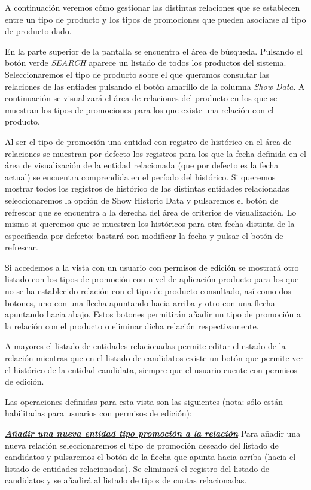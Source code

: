 A continuación veremos cómo gestionar las distintas relaciones que se establecen entre un tipo de producto y los tipos de promociones que pueden asociarse al tipo de producto dado.


En la parte superior de la pantalla se encuentra el área de búsqueda. Pulsando el botón verde \emph{SEARCH} aparece un listado de todos los productos del sistema. Seleccionaremos el tipo de producto sobre el que queramos consultar las relaciones de las entiades pulsando el botón amarillo de la columna \emph{Show Data}. A continuación se visualizará el área de relaciones del producto en los que se muestran los tipos de promociones para los que existe una relación con el producto.

Al ser el tipo de promoción una entidad con registro de histórico en el área de relaciones se muestran por defecto los registros para los que la fecha definida en el área de visualización de la entidad relacionada (que por defecto es la fecha actual) se encuentra comprendida en el período del histórico. Si queremos mostrar todos los registros de histórico de las distintas entidades relacionadas seleccionaremos la opción de Show Historic Data y pulsaremos el botón de refrescar que se encuentra a la derecha del área de criterios de visualización. Lo mismo si queremos que se muestren los históricos para otra fecha distinta de la especificada por defecto: bastará con modificar la fecha y pulsar el botón de refrescar.

Si accedemos a la vista con un usuario con permisos de edición se mostrará otro listado con los tipos de promoción con nivel de aplicación producto para los que no se ha establecido relación con el tipo de producto consultado, así como dos botones, uno con una flecha apuntando hacia arriba y otro con una flecha apuntando hacia abajo. Estos botones permitirán añadir un tipo de promoción a la relación con el producto o eliminar dicha relación respectivamente. 

A mayores el listado de entidades relacionadas permite editar el estado de la relación mientras que en el listado de candidatos existe un botón que permite ver el histórico de la entidad candidata, siempre que el usuario cuente con permisos de edición.


Las operaciones definidas para esta vista son las siguientes (nota: sólo están habilitadas para usuarios con permisos de edición):

\underline{\textsl{\textbf{Añadir una nueva entidad tipo promoción a la relación}}} \newline
Para añadir una nueva relación seleccionaremos el tipo de promoción deseado del listado de candidatos y pulsaremos el botón de la flecha que apunta hacia arriba (hacia el listado de entidades relacionadas). Se eliminará el registro del listado de candidatos y se añadirá al listado de tipos de cuotas relacionadas.


